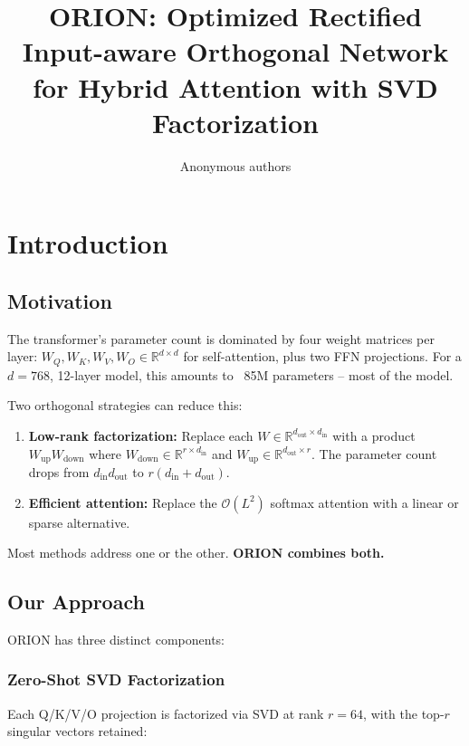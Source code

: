 \title{\textbf{ORION: Optimized Rectified Input-aware Orthogonal Network for Hybrid Attention with SVD Factorization}}

\author{Anonymous authors}



\section{Introduction}

\subsection{Motivation}

The transformer's parameter count is dominated by four weight matrices 
per layer: $W_Q, W_K, W_V, W_O \in \mathbb{R}^{d \times d}$ for self-attention, 
plus two FFN projections. For a $d = 768$, 12-layer model, this amounts 
to ~85M parameters -- most of the model.

Two orthogonal strategies can reduce this:

\begin{enumerate}
\item \textbf{Low-rank factorization:} Replace each $W \in \mathbb{R}^{d_\text{out} \times d_\text{in}}$
  with a product $W_\text{up} W_\text{down}$ where $W_\text{down} \in \mathbb{R}^{r \times d_\text{in}}$
  and $W_\text{up} \in \mathbb{R}^{d_\text{out} \times r}$. The parameter
  count drops from $d_\text{in} d_\text{out}$ to $r(d_\text{in} + d_\text{out})$.

\item \textbf{Efficient attention:} Replace the $\mathcal{O}(L^2)$ softmax attention
  with a linear or sparse alternative.

\end{enumerate}
Most methods address one or the other. \textbf{ORION combines both.}

\subsection{Our Approach}

ORION has three distinct components:

\subsubsection{Zero-Shot SVD Factorization}

Each Q/K/V/O projection is factorized via SVD at rank $r = 64$, with 
the top-$r$ singular vectors retained:

